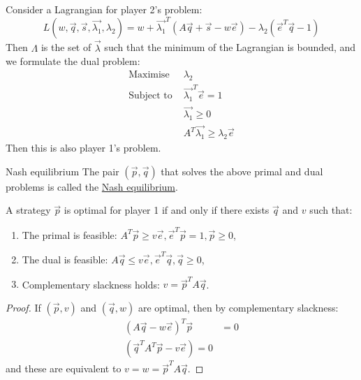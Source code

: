 \documentclass[../Main.tex]{subfiles}
\begin{document}
Consider a Lagrangian for player 2's problem:
\begin{equation*}
    L(w, \vec{q}, \vec{s}, \vec{\lambda_1}, \lambda_2) = w + \vec{\lambda_1}^T \left(A\vec{q} + \vec{s} - w\vec{e}\right) - \lambda_2\left(\vec{e}^T\vec{q} - 1\right)
\end{equation*}
Then $\Lambda$ is the set of $\vec{\lambda}$ such that the minimum of the Lagrangian is bounded, and we formulate the dual problem:
\begin{align*}
    \text{Maximise } &\lambda_2 \\
    \text{Subject to } &\vec{\lambda_1}^T \vec{e} = 1 \\
    &\vec{\lambda_1} \geq 0 \\
    &A^T \vec{\lambda_1} \geq \lambda_2\vec{e}
\end{align*}
Then this is also player 1's problem.

\begin{definition}{Nash equilibrium}
    The pair $(\vec{p}, \vec{q})$ that solves the above primal and dual problems is called the \underline{Nash equilibrium}.
\end{definition}

\begin{theorem}
    A strategy $\vec{p}$ is optimal for player 1 if and only if there exists $\vec{q}$ and $v$ such that:
    \begin{enumerate}
        \item The primal is feasible: $A^T\vec{p} \geq v\vec{e}, \vec{e}^T \vec{p} = 1, \vec{p} \geq 0$,
        \item The dual is feasible: $A\vec{q} \leq v\vec{e}, \vec{e}^T\vec{q}, \vec{q} \geq 0$,
        \item Complementary slackness holds: $v = \vec{p}^T A \vec{q}$.
    \end{enumerate}
\end{theorem}
\begin{proof}
    If $(\vec{p}, v)$ and $(\vec{q}, w)$ are optimal, then by complementary slackness:
    \begin{align*}
        (A\vec{q} - w\vec{e})^T \vec{p} &= 0 \\
        (\vec{q}^T A^T\vec{p} - v\vec{e}) = 0
    \end{align*}
    and these are equivalent to $v = w = \vec{p}^T A \vec{q}$.
\end{proof}
\end{document}
